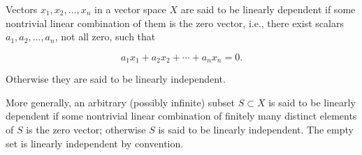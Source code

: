 Vectors $x_1, x_2, \ldots, x_n$ in a vector space $X$ are said to be linearly dependent if some nontrivial linear combination of them is the zero vector, i.e., there exist scalars $a_1, a_2, \ldots, a_n$, not all zero, such that

$$a_1 x_1 + a_2 x_2 + \cdots + a_n x_n = 0.$$

Otherwise they are said to be linearly independent.

More generally, an arbitrary (possibly infinite) subset $S \subset X$ is said to be linearly dependent if some nontrivial linear combination of finitely many distinct elements of $S$ is the zero vector; otherwise $S$ is said to be linearly independent. The empty set is linearly independent by convention.
